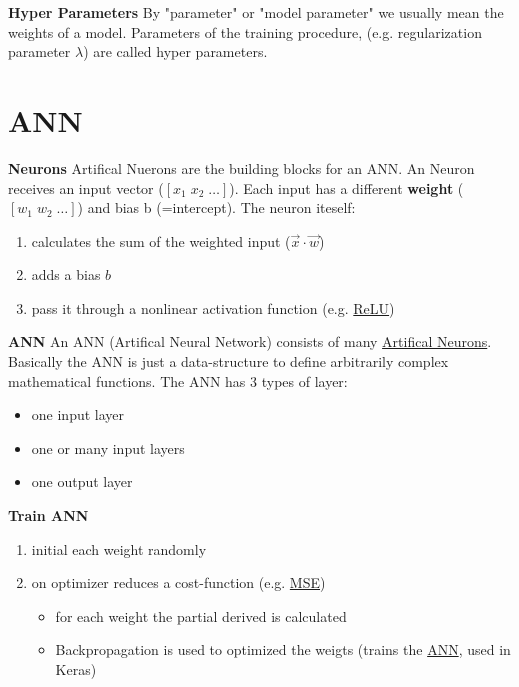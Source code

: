 \documentclass[11pt,twoside,landscape]{article}
\begin{document}
\begin{multicols}{3}
\textbf{Hyper Parameters}
By "parameter" or "model parameter" we usually mean the weights of a model.
Parameters of the training procedure, (e.g. regularization parameter \(\lambda\)) are called hyper parameters.

\section{ANN}
\label{sec:org9bd63c0}

\textbf{Neurons}
Artifical Nuerons are the building blocks for an ANN.
An Neuron receives an input vector (\([x_1 \; x_2 \; \ldots]\)).
Each input has a different \textbf{weight} (\([w_1 \; w_2 \; \ldots]\)) and bias b (=intercept).
The neuron iteself:
\begin{enumerate}
\item calculates the sum of the weighted input (\(\vec{x} \cdot \vec{w}\))
\item adds a bias \(b\)
\item pass it through a nonlinear activation function (e.g. \href{../../../roam/20211214121924-relu.org}{ReLU})
\end{enumerate}


\textbf{ANN}
An ANN (Artifical Neural Network) consists of many \href{../../../roam/20211214121841-artifical_neurons.org}{Artifical Neurons}.
Basically the ANN is just a data-structure to define arbitrarily complex mathematical functions.
The ANN has 3 types of layer:
\begin{itemize}
\item one input layer
\item one or many input layers
\item one output layer
\end{itemize}


\textbf{Train ANN}
\begin{enumerate}
\item initial each weight randomly
\item on optimizer reduces a cost-function (e.g. \href{../../../roam/20211004175550-mean_squared_error.org}{MSE})
\begin{itemize}
\item for each weight the partial derived is calculated
\item Backpropagation is used to optimized the weigts (trains the \href{../../../roam/20211214110732-ann.org}{ANN}, used in Keras)
\end{itemize}
\end{enumerate}


\end{multicols}
\end{document}
